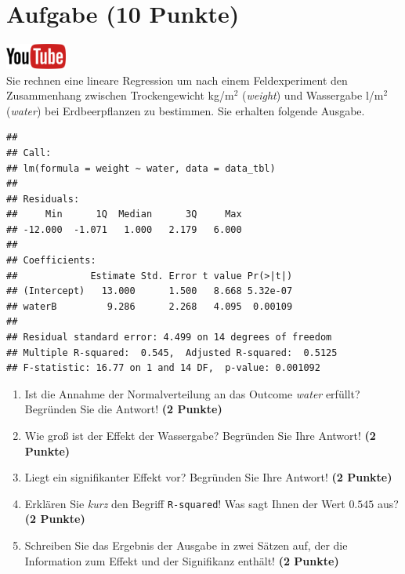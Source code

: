 \documentclass[a4paper, 9pt]{scrartcl}\usepackage[]{graphicx}\usepackage[]{xcolor}
\makeatletter
\newenvironment{kframe}{%
 \def\at@end@of@kframe{}%
 \ifinner\ifhmode%
  \def\at@end@of@kframe{\end{minipage}}%
  \begin{minipage}{\columnwidth}%
 \fi\fi%
 \def\FrameCommand##1{\hskip\@totalleftmargin \hskip-\fboxsep
 \colorbox{shadecolor}{##1}\hskip-\fboxsep
     \hskip-\linewidth \hskip-\@totalleftmargin \hskip\columnwidth}%
 \MakeFramed {\advance\hsize-\width
   \@totalleftmargin\z@ \linewidth\hsize
   \@setminipage}}%
 {\par\unskip\endMakeFramed%
 \at@end@of@kframe}
\newenvironment{knitrout}{}{} %
\makeatother
\begin{document}
\section{Aufgabe \hfill (10 Punkte)}

\hfill\href{https://youtu.be/tNNzcndrpSk}{\includegraphics[width =
  2cm]{img/youtube}}\\[1Ex]

Sie rechnen eine lineare Regression um nach einem Feldexperiment den
Zusammenhang zwischen Trockengewicht kg/m$^2$ (\textit{weight}) und
Wassergabe l/m$^2$ (\textit{water}) bei Erdbeerpflanzen zu bestimmen. Sie
erhalten folgende \Rlogo Ausgabe.

\begin{knitrout}
\color{fgcolor}\begin{kframe}
\begin{verbatim}
## 
## Call:
## lm(formula = weight ~ water, data = data_tbl)
## 
## Residuals:
##     Min      1Q  Median      3Q     Max 
## -12.000  -1.071   1.000   2.179   6.000 
## 
## Coefficients:
##             Estimate Std. Error t value Pr(>|t|)
## (Intercept)   13.000      1.500   8.668 5.32e-07
## waterB         9.286      2.268   4.095  0.00109
## 
## Residual standard error: 4.499 on 14 degrees of freedom
## Multiple R-squared:  0.545,	Adjusted R-squared:  0.5125 
## F-statistic: 16.77 on 1 and 14 DF,  p-value: 0.001092
\end{verbatim}
\end{kframe}
\end{knitrout}


\begin{enumerate}
\item Ist die Annahme der Normalverteilung an das Outcome \textit{water}
  erf{\"u}llt?  Begr{\"u}nden Sie die Antwort! \textbf{(2 Punkte)}
\item Wie gro{\ss} ist der Effekt der Wassergabe?  Begr{\"u}nden Sie Ihre Antwort! \textbf{(2 Punkte)} 
\item Liegt ein signifikanter
  Effekt vor? Begr{\"u}nden Sie Ihre Antwort! \textbf{(2 Punkte)}
\item Erkl{\"a}ren Sie \textit{kurz} den Begriff \texttt{R-squared}!
  Was sagt Ihnen der Wert $0.545$ aus? \textbf{(2 Punkte)}
\item Schreiben Sie das Ergebnis der \Rlogo Ausgabe in zwei S{\"a}tzen auf, der die
  Information zum Effekt und der Signifikanz enth{\"a}lt! \textbf{(2 Punkte)} 
\end{enumerate}
 
\end{document}
